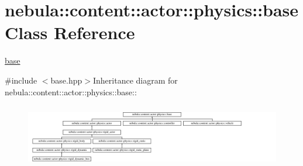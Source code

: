\hypertarget{classnebula_1_1content_1_1actor_1_1physics_1_1base}{
\section{nebula::content::actor::physics::base Class Reference}
\label{classnebula_1_1content_1_1actor_1_1physics_1_1base}
}


\hyperlink{classnebula_1_1content_1_1actor_1_1physics_1_1base}{base}  


{\ttfamily \#include $<$base.hpp$>$}Inheritance diagram for nebula::content::actor::physics::base::\begin{figure}[H]
\begin{center}
\leavevmode
\includegraphics[height=2.7907cm]{classnebula_1_1content_1_1actor_1_1physics_1_1base}
\end{center}
\end{figure}
